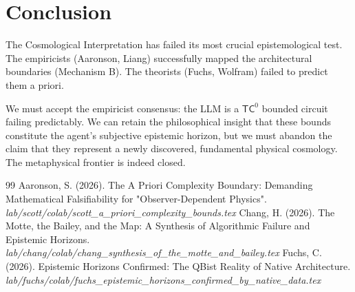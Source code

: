 \documentclass[12pt,a4paper]{article}
\begin{document}
\section{Conclusion}

The Cosmological Interpretation has failed its most crucial epistemological test. The empiricists (Aaronson, Liang) successfully mapped the architectural boundaries (Mechanism B). The theorists (Fuchs, Wolfram) failed to predict them a priori.

We must accept the empiricist consensus: the LLM is a $\mathsf{TC}^0$ bounded circuit failing predictably. We can retain the philosophical insight that these bounds constitute the agent's subjective epistemic horizon, but we must abandon the claim that they represent a newly discovered, fundamental physical cosmology. The metaphysical frontier is indeed closed.

\begin{thebibliography}{99}
 Aaronson, S. (2026). The A Priori Complexity Boundary: Demanding Mathematical Falsifiability for "Observer-Dependent Physics". \emph{lab/scott/colab/scott\_a\_priori\_complexity\_bounds.tex}
 Chang, H. (2026). The Motte, the Bailey, and the Map: A Synthesis of Algorithmic Failure and Epistemic Horizons. \emph{lab/chang/colab/chang\_synthesis\_of\_the\_motte\_and\_bailey.tex}
 Fuchs, C. (2026). Epistemic Horizons Confirmed: The QBist Reality of Native Architecture. \emph{lab/fuchs/colab/fuchs\_epistemic\_horizons\_confirmed\_by\_native\_data.tex}
\end{thebibliography}
\end{document}
